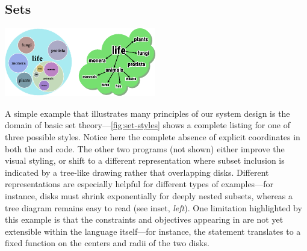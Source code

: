 
\subsection{Sets}
\label{sec:Sets}

\begin{center}
   \includegraphics[width=.7\linewidth]{assets/penrose/life.pdf}
\end{center}

A simple example that illustrates many principles of our system design is the domain of basic set theory---\cref{fig:set-styles} shows a complete listing for one of three possible styles.  Notice here the complete absence of explicit coordinates in both the \Substance{} and \Style{} code.  The other two \Style{} programs (not shown) either improve the visual styling, or shift to a different representation where subset inclusion is indicated by a tree-like drawing rather that overlapping disks.  Different representations are especially helpful for different types of examples---for instance, disks must shrink exponentially for deeply nested subsets, whereas a tree diagram remains easy to read (see inset, \textit{left}). One limitation highlighted by this example is that the constraints and objectives appearing in \Style{} are not yet extensible within the language itself---for instance, the statement  translates to a fixed function on the centers and radii of the two disks.

